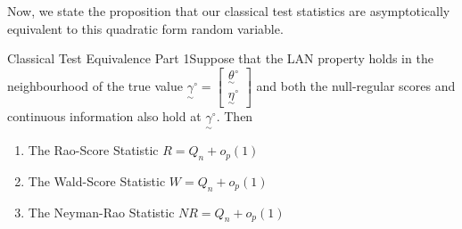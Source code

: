 \documentclass[twoside]{article}
\newcommand{\utilde}{\underset{\sim}}
\begin{document}
Now, we state the proposition that our classical test statistics are asymptotically equivalent to this quadratic form random variable.
\newpage
\begin{theorem_exam}{Classical Test Equivalence Part 1}{}Suppose that the LAN property holds in the neighbourhood of the true value $\utilde{\gamma}^{\circ} = \begin{bmatrix} \utilde{\theta}^{\circ} \\ \utilde{\eta}^{\circ} \end{bmatrix}$ and both the null-regular scores and continuous information also hold at $\utilde{\gamma}^{\circ}.$ Then 
\begin{enumerate}
\item The Rao-Score Statistic $R = Q_n + o_p(1)$
\item The Wald-Score Statistic $W = Q_n + o_p(1)$
\item The Neyman-Rao Statistic $NR = Q_n + o_p(1)$
\end{enumerate}
\end{theorem_exam}
\end{document}
